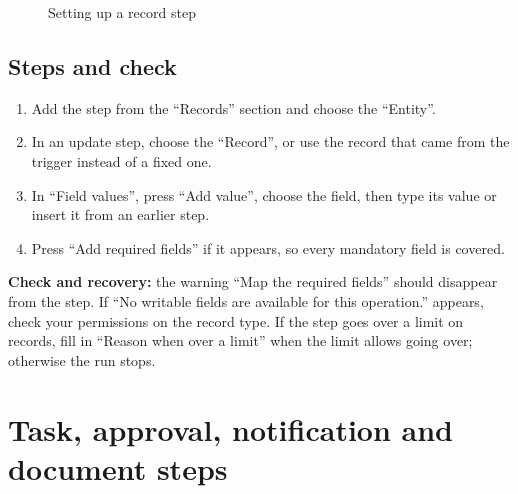 \begin{figure}[H]
\centering
{}
\rclegend
\caption{Setting up a record step}
\label{fig:builder-isop-records-flow}
\end{figure}

\subsection{Steps and check}
\begin{enumerate}
\item Add the step from the “Records” section and choose the “Entity”.
\item In an update step, choose the “Record”, or use the record that came from the trigger instead of a fixed one.
\item In “Field values”, press “Add value”, choose the field, then type its value or insert it from an earlier step.
\item Press “Add required fields” if it appears, so every mandatory field is covered.
\end{enumerate}

\textbf{Check and recovery:} the warning “Map the required fields” should disappear from the step. If “No writable fields are available for this operation.” appears, check your permissions on the record type. If the step goes over a limit on records, fill in “Reason when over a limit” when the limit allows going over; otherwise the run stops.

\clearpage
\section{Task, approval, notification and document steps}
\label{sec:builder-feature-isop-people}

